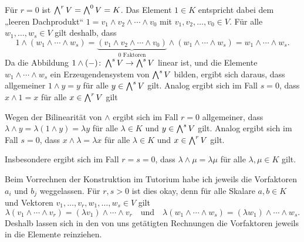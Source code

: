 \begin{remark}
  \label{remark: wedge product with scalars}
  Für $r = 0$ ist $\bigwedge^{r} V = \bigwedge^{0} V = K$.
  Das Element $1 \in K$ entspricht dabei dem „leeren Dachprodukt“ $1 = v_1 \wedge v_2 \wedge \dotsb \wedge v_0$ mit $v_1, v_2, \dotsc, v_0 \in V$.
  Für alle $w_1, \dotsc, w_s \in V$ gilt deshalb, dass
  \[
      1 \wedge (w_1 \wedge \dotsb \wedge w_s)
    = \underbrace{(v_1 \wedge v_2 \wedge \dotsb \wedge v_0)}_{\text{$0$ Faktoren}} \wedge (w_1 \wedge \dotsb \wedge w_s)
    = w_1 \wedge \dotsb \wedge w_s.
  \]
  Da die Abbildung $1 \wedge (-) \colon \bigwedge^{s} V \to \bigwedge^{s} V$ linear ist, und die Elemente $w_1 \wedge \dotsb \wedge w_s$  ein Erzeugendensystem von $\bigwedge^{s} V$ bilden, ergibt sich daraus, dass allgemeiner $1 \wedge y = y$ für alle $y \in \bigwedge^{s} V$ gilt.
  Analog ergibt sich im Fall $s = 0$, dass $x \wedge 1 = x$ für alle $x \in \bigwedge^{r} V$ gilt
  
  Wegen der Bilinearität von $\wedge$ ergibt sich im Fall $r = 0$ allgemeiner, dass $\lambda \wedge y = \lambda(1 \wedge y) = \lambda y$ für alle $\lambda \in K$ und $y \in \bigwedge^{s} V$ gilt.
  Analog ergibt sich im Fall $s = 0$, dass $x \wedge \lambda = \lambda x$ für alle $\lambda \in K$ und $x \in \bigwedge^{r} V$ gilt.
  
  Insbesondere ergibt sich im Fall $r = s = 0$, dass $\lambda \wedge \mu = \lambda \mu$ für alle $\lambda, \mu \in K$ gilt.
\end{remark}

\begin{remark*}
  Beim Vorrechnen der Konstruktion im Tutorium habe ich jeweils die Vorfaktoren $a_i$ und $b_j$ weggelassen.
  Für $r, s > 0$ ist dies okay, denn für alle Skalare $a, b \in K$ und Vektoren $v_1, \dotsc, v_r, w_1, \dotsc, w_s \in V$ gilt
  \[
      \lambda (v_1 \wedge \dotsb \wedge v_r)
    = (\lambda v_1) \wedge \dotsb \wedge v_r
    \quad\text{und}\quad
      \lambda (w_1 \wedge \dotsb \wedge w_s)
    = (\lambda w_1) \wedge \dotsb \wedge w_s.
  \]
  Deshalb lassen sich in den von uns getätigten Rechnungen die Vorfaktoren jeweils in die Elemente reinziehen.
\end{remark*}





\subsection{}

